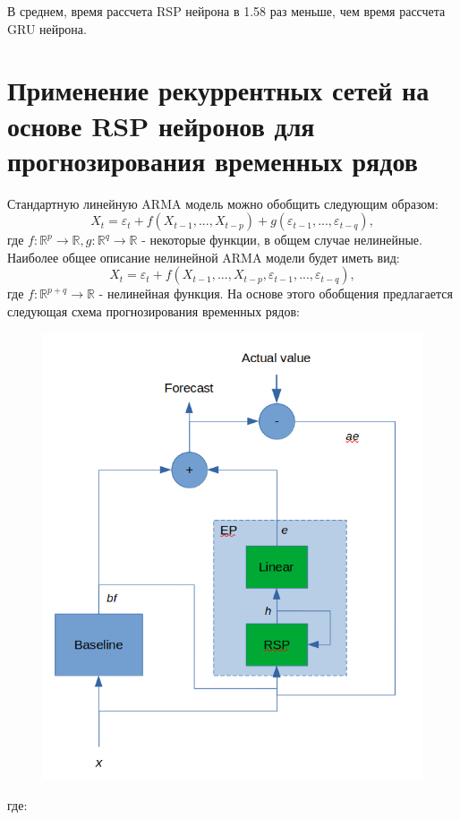 \documentclass[11pt]{article}
\begin{document}
В среднем, время рассчета RSP нейрона в 1.58 раз меньше, чем время рассчета GRU нейрона.
   
\section*{Применение рекуррентных сетей на основе RSP нейронов для прогнозирования временных рядов}
Стандартную линейную ARMA модель можно обобщить следующим образом:
$$ X_t = \varepsilon_t + f(X_{t-1}, ..., X_{t-p}) + g(\varepsilon_{t-1},...,\varepsilon_{t-q}) ,$$
где $f: \mathbb{R}^p \to \mathbb{R}, g: \mathbb{R}^q \to \mathbb{R} $ - некоторые функции, в общем случае нелинейные. Наиболее общее описание нелинейной ARMA модели будет иметь вид:
$$ X_t = \varepsilon_t + f(X_{t-1}, ..., X_{t-p}, \varepsilon_{t-1}, ..., \varepsilon_{t-q}) ,$$
где $f: \mathbb{R}^{p+q} \to \mathbb{R}$ - нелинейная функция. На основе этого обобщения предлагается следующая схема прогнозирования временных рядов:
\begin{figure}[H]
\centering
\includegraphics[scale=0.3]{rsp_forecasting_scheme.png}
\label{}
\end{figure}
где:
\end{document}
